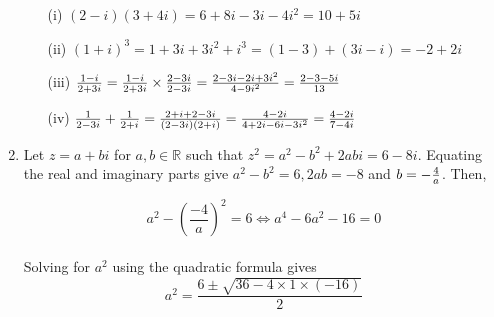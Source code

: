 \documentclass[12pt]{amsart}
\begin{document}
\begin{enumerate}
\begin{enumerate}
			\item[(i)] $(2-i)(3+4i) = 6+8i-3i -4i^2 = 10+5i$ \medskip
			
			\item[(ii)] $(1+i)^3 = 1+3i+3i^2+i^3=(1-3)+(3i-i)=-2+2i$ \medskip
			
			\item[(iii)] \large ${1-i\over2+3i} ={1-i\over2+3i}\times {2-3i\over2-3i}={2-3i-2i+3i^2\over4-9i^2}					={2-3-5i\over13}$ \medskip
			
				
			\normalsize
			
			\medskip
			
			\item[(iv)] \large ${1\over2-3i}+{1\over2+i} = {2+i+2-3i\over(2-3i)(2+i)}={4-2i\over4+2i-6i-3i^2}=
				{4-2i\over7-4i}$ \medskip
				
				 \medskip
				
		\end{enumerate}
		
		\bigskip
	
	\item Let $z=a+bi$ for $a,b \in \mathbb{R}$ such that $z^2=a^2-b^2+2abi=6-8i$.  Equating the real and 			imaginary parts give $a^2-b^2=6, 2ab=-8$ and $b=-{4\over a}$. Then,
	
		\begin{equation*}
			a^2-\left(\frac{-4}{a}\right)^2 =6 \Longleftrightarrow a^4 -6a^2-16=0
		\end{equation*}
		\\
		Solving for $a^2$ using the quadratic formula gives
		\\
		\begin{equation*}
			a^2=\frac{6\pm \sqrt{36-4\times1\times(-16)}}{2}
		\end{equation*}
		

\end{enumerate}
\end{document}
